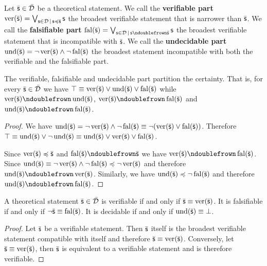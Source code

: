\documentclass[11pt,letterpaper,fleqn]{memoir} %
\begin{document}
\begin{mathSection}
	\begin{defn}
		Let $\bar{\mathsf{s}} \in \bar{\mathcal{D}}$ be a theoretical statement. We call the \textbf{verifiable part} $\operatorname{ver}(\bar{\mathsf{s}}) = \bigvee_{\mathsf{s} \in \mathcal{D} \, | \, \mathsf{s} \preccurlyeq \bar{\mathsf{s}}} \mathsf{s}$ the broadest verifiable statement that is narrower than $\bar{\mathsf{s}}$. We call the \textbf{falsifiable part} $\fal(\bar{\stmt}) = \bigOR_{\stmt \in \edomain \, | \, \stmt \ncomp \bar{\stmt}} \stmt$ the broadest verifiable statement that is incompatible with $\bar{\mathsf{s}}$. We call the \textbf{undecidable part} $\operatorname{und}(\bar{\mathsf{s}}) = \neg \operatorname{ver}(\bar{\mathsf{s}}) \wedge \neg \operatorname{fal}(\bar{\mathsf{s}})$ the broadest statement incompatible with both the verifiable and the falsifiable part.
	\end{defn}

\begin{coro}
	The verifiable, falsifiable and undecidable part partition the certainty. That is, for every $\bar{\mathsf{s}} \in \bar{\mathcal{D}}$ we have $\top \equiv \operatorname{ver}(\bar{\mathsf{s}}) \vee \operatorname{und}(\bar{\mathsf{s}}) \vee \operatorname{fal}(\bar{\mathsf{s}})$ while $\ver(\bar{\stmt}) \ncomp \und(\bar{\stmt})$, $\ver(\bar{\stmt}) \ncomp \fal(\bar{\stmt})$ and $\und(\bar{\stmt}) \ncomp \fal(\bar{\stmt})$.
\end{coro}
	
\begin{proof}
	We have $\operatorname{und}(\bar{\mathsf{s}}) = \neg \operatorname{ver}(\bar{\mathsf{s}}) \wedge \neg \operatorname{fal}(\bar{\mathsf{s}}) \equiv \neg (\operatorname{ver}(\bar{\mathsf{s}}) \vee \operatorname{fal}(\bar{\mathsf{s}}))$. Therefore $\top \equiv \operatorname{und}(\bar{\mathsf{s}}) \vee \neg \operatorname{und}(\bar{\mathsf{s}}) \equiv \operatorname{und}(\bar{\mathsf{s}}) \vee \operatorname{ver}(\bar{\mathsf{s}}) \vee \operatorname{fal}(\bar{\mathsf{s}})$.
	
	Since $\operatorname{ver}(\bar{\mathsf{s}}) \preccurlyeq \bar{\mathsf{s}}$ and $\fal(\bar{\stmt}) \ncomp \bar{\stmt}$ we have $\ver(\bar{\stmt}) \ncomp \fal(\bar{\stmt})$. Since $\operatorname{und}(\bar{\mathsf{s}}) \equiv \neg \operatorname{ver}(\bar{\mathsf{s}}) \wedge \neg \operatorname{fal}(\bar{\mathsf{s}}) \preccurlyeq \neg \operatorname{ver}(\bar{\mathsf{s}})$ and therefore $\und(\bar{\stmt}) \ncomp \ver(\bar{\stmt})$. Similarly, we have $\operatorname{und}(\bar{\mathsf{s}}) \preccurlyeq \neg \operatorname{fal}(\bar{\mathsf{s}})$ and therefore $\und(\bar{\stmt}) \ncomp \fal(\bar{\stmt})$.
\end{proof}
	
\begin{coro}
	A theoretical statement $\bar{\mathsf{s}} \in \bar{\mathcal{D}}$ is verifiable if and only if $\bar{\mathsf{s}} \equiv \operatorname{ver}(\bar{\mathsf{s}})$. It is falsifiable if and only if $\neg\bar{\mathsf{s}} \equiv \operatorname{fal}(\bar{\mathsf{s}})$. It is decidable if and only if $\operatorname{und}(\bar{\mathsf{s}}) \equiv \bot$.
\end{coro}
\begin{proof}
	Let $\bar{\mathsf{s}}$ be a verifiable statement. Then $\bar{\mathsf{s}}$ itself is the broadest verifiable statement compatible with itself and therefore $\bar{\mathsf{s}} \equiv \operatorname{ver}(\bar{\mathsf{s}})$. Conversely, let $\bar{\mathsf{s}} \equiv \operatorname{ver}(\bar{\mathsf{s}})$, then $\bar{\mathsf{s}}$ is equivalent to a verifiable statement and is therefore verifiable.
	

\end{proof}
\end{mathSection}
\end{document}
